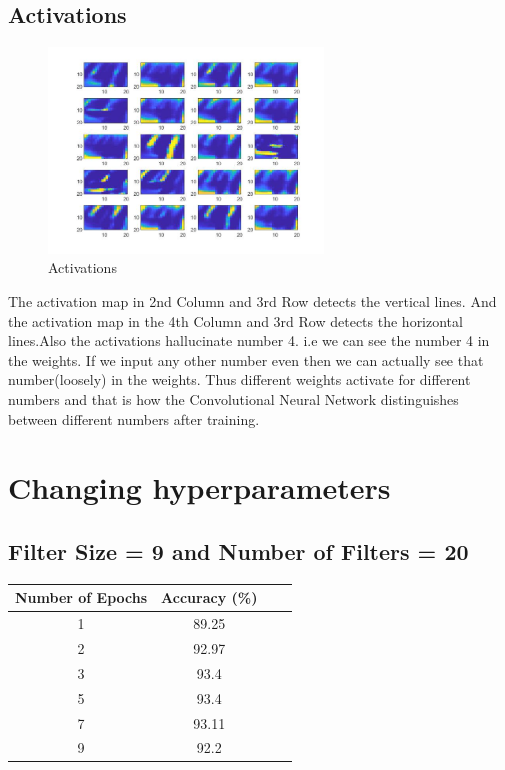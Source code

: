 \documentclass{article}
\begin{document}
\subsection{Activations}
\begin{figure}[H]
\includegraphics[width=0.65\textwidth]{map.jpg}
\centering
\caption{Activations }
\end{figure}
The activation map in 2nd Column and 3rd Row detects the vertical lines. And the activation map in the 4th Column and 3rd Row detects the horizontal lines.Also the activations hallucinate number 4. i.e we can see the number 4 in the weights. If we input any other number even then we can actually see that number(loosely) in the weights. Thus different weights activate for different numbers and that is how the Convolutional Neural Network distinguishes between different numbers after training.

\section{Changing hyperparameters}
\subsection{Filter Size = 9 and Number of Filters = 20}
\begin{center}
 \begin{tabular}{||c| c| c| c||} 
 \hline
 Number of Epochs & Accuracy (\%)\\ [0.5ex] 
 \hline\hline
 1 & 89.25  \\ 
 \hline
 2 & 92.97 \\ 
 \hline
 3 & 93.4 \\
 \hline
 5 & 93.4  \\
 \hline
 7 & 93.11  \\
 \hline
 9 & 92.2 \\ [1ex] 
 \hline
\end{tabular}
\end{center}
\end{document}
